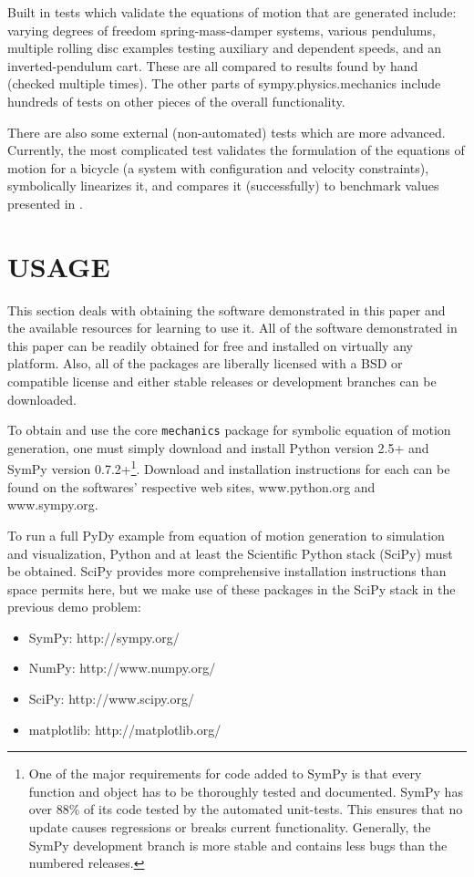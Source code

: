 \documentclass[twocolumn,10pt, final]{asme2e}
\begin{document}
Built in tests which validate the equations of motion that are generated
include: varying degrees of freedom spring-mass-damper systems, various
pendulums, multiple rolling disc examples testing auxiliary and dependent
speeds, and an inverted-pendulum cart. These are all compared to results found
by hand (checked multiple times). The other parts of sympy.physics.mechanics
include hundreds of tests on other pieces of the overall functionality.

There are also some external (non-automated) tests which are more advanced.
Currently, the most complicated test validates the formulation of the equations
of motion for a bicycle (a system with configuration and velocity constraints),
symbolically linearizes it, and compares it (successfully) to benchmark values
presented in \cite{Meijaard2007}.

\section*{USAGE}
This section deals with obtaining the software demonstrated in this paper and
the available resources for learning to use it. All of the software
demonstrated in this paper can be readily obtained for free and installed on
virtually any platform. Also, all of the packages are liberally licensed with a
BSD or compatible license and either stable releases or development branches
can be downloaded.

To obtain and use the core \verb|mechanics| package for symbolic equation of
motion generation, one must simply download and install Python version 2.5+ and
SymPy version 0.7.2+\footnote{One of the major requirements for code added to
SymPy is that every function and object has to be thoroughly tested and
documented. SymPy has over 88\% of its code tested by the automated unit-tests.
This ensures that no update causes regressions or breaks current functionality.
Generally, the SymPy development branch is more stable and contains less bugs
than the numbered releases.}. Download and installation instructions for each
can be found on the softwares' respective web sites, www.python.org and
www.sympy.org.

To run a full PyDy example from equation of motion generation to simulation and
visualization, Python and at least the Scientific Python stack (SciPy)
\cite{SciPyStackGithub} must be obtained. SciPy provides more comprehensive
installation instructions than space permits here, but we make use of these
packages in the SciPy stack in the previous demo problem:
%
\begin{itemize}
  \item SymPy: http://sympy.org/
  \item NumPy: http://www.numpy.org/
  \item SciPy: http://www.scipy.org/
  \item matplotlib: http://matplotlib.org/
\end{itemize}
\end{document}
